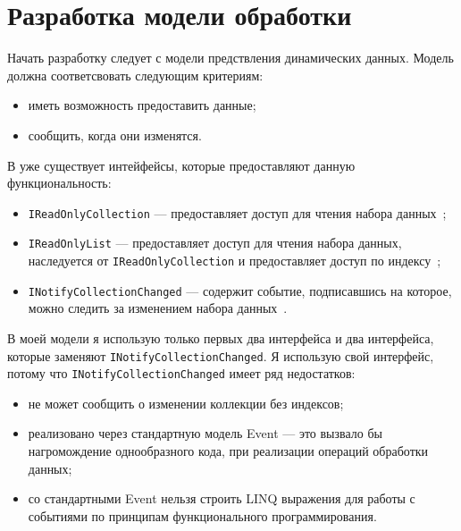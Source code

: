 \section{Разработка модели обработки}
\label{sec:research:development_model}

Начать разработку следует с модели предствления динамических данных. Модель должна соответсвовать следующим критериям:

\begin{itemize}
  \item иметь возможность предоставить данные;
  \item сообщить, когда они изменятся.
\end{itemize}

В \dotnet{} уже существует интейфейсы, которые предоставляют данную функциональность:

\begin{itemize}
  \item \lstinline[style=csharpinlinestyle]!IReadOnlyCollection! --- предоставляет доступ для чтения набора данных~\cite{ireadonlycollection};
  \item \lstinline[style=csharpinlinestyle]!IReadOnlyList! --- предоставляет доступ для чтения набора данных,
  наследуется от \lstinline[style=csharpinlinestyle]!IReadOnlyCollection! и предоставляет доступ по индексу~\cite{ireadonlylist};
  \item \lstinline[style=csharpinlinestyle]!INotifyCollectionChanged! --- содержит событие, подписавшись на которое, можно следить за изменением набора данных~\cite{inotifycollectionchanged}.
\end{itemize}

В моей модели я использую только первых два интерфейса и два интерфейса, которые заменяют \lstinline[style=csharpinlinestyle]!INotifyCollectionChanged!.
Я использую свой интерфейс, потому что \lstinline[style=csharpinlinestyle]!INotifyCollectionChanged! имеет ряд недостатков:

\begin{itemize}
  \item не может сообщить о изменении коллекции без индексов;
  \item реализовано через стандартную модель Event --- это вызвало бы нагромождение однообразного кода, при реализации операций обработки данных;
  \item со стандартными Event нельзя строить LINQ выражения для работы с событиями по принципам функционального программирования.
\end{itemize}

